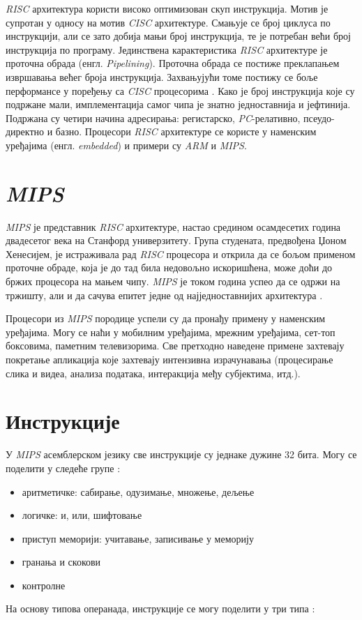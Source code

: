 \documentclass[12pt,oneside]{memoir}
\begin{document}
\textit{RISC} архитектура користи високо оптимизован скуп инструкција. Мотив је супротан у односу на мотив
\textit{CISC} архитектуре. Смањује се број циклуса по инструкцији, али се зато добија мањи број инструкција, те је
потребан већи број инструкција по програму. Јединствена карактеристика \textit{RISC} архитектуре је проточна обрада
(енгл. \textit{Pipelining}). Проточна обрада се постиже преклапањем извршавања већег броја инструкција. Захвањујући
томе постижу се боље перформансе у поређењу са \textit{CISC} процесорима \cite{CR}. Како је број инструкција које су
подржане мали, имплементација самог чипа је знатно једноставнија и јефтинија. Подржана су четири начина адресирања:
регистарско, \textit{PC}-релативно, псеудо-директно и базно. Процесори \textit{RISC} архитектуре се користе у
наменским уређајима (енгл. \textit{embedded}) и примери су \textit{ARM} и \textit{MIPS}.

\section{\textit{MIPS}} \label{chp:MIPS}

\textit{MIPS} је представник \textit{RISC} архитектуре, настао средином осамдесетих година двадесетог века на
Станфорд универзитету. Група студената, предвођена Џоном Хенесијем, је истраживала рад \textit{RISC} процесора и
открила да се бољом применом проточне обраде, која је до тад била недовољно искоришћена, може доћи до бржих
процесора на мањем чипу. \textit{MIPS} је током година успео да се одржи на тржишту, али и да сачува епитет једне од
најједноставнијих архитектура \cite{SMR}.

Процесори из \textit{MIPS} породице успели су да пронађу примену у наменским уређајима. Могу се наћи у мобилним
уређајима, мрежним уређајима, сет-топ боксовима, паметним телевизорима. Све претходно наведене примене захтевају
покретање апликација које захтевају интензивна израчунавања (процесирање слика и видеа, анализа података,
интеракција међу субјектима, итд.).

\section{Инструкције} \label{chp:INS}

У \textit{MIPS} асемблерском језику све инструкције су једнаке дужине 32 бита. Могу се поделити у следеће групе
\cite{ISA}:

\begin{itemize}
	\item аритметичке: сабирање, одузимање, множење, дељење
	\item логичке: и, или, шифтовање
	\item приступ меморији: учитавање, записивање у меморију
	\item гранања и скокови
	\item контролне
\end{itemize}
На основу типова операнада, инструкције се могу поделити у три типа \cite{SMR}:
\end{document}
